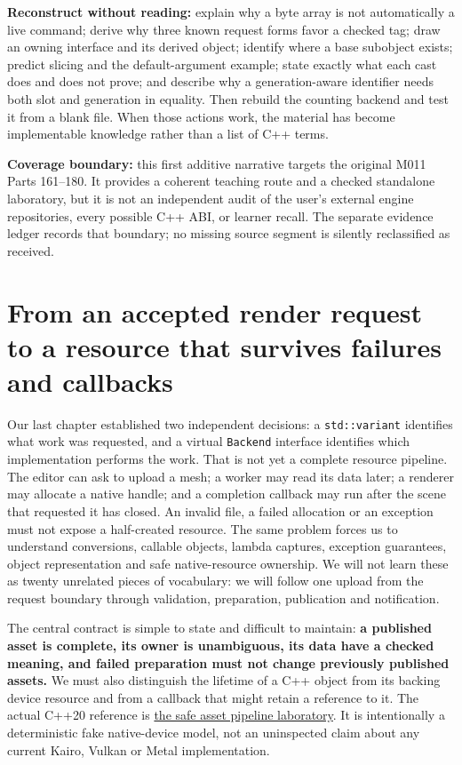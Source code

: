 \textbf{Reconstruct without reading:} explain why a byte array is not automatically a live command; derive why three known request forms favor a checked tag; draw an owning interface and its derived object; identify where a base subobject exists; predict slicing and the default-argument example; state exactly what each cast does and does not prove; and describe why a generation-aware identifier needs both slot and generation in equality. Then rebuild the counting backend and test it from a blank file. When those actions work, the material has become implementable knowledge rather than a list of C++ terms.

\textbf{Coverage boundary:} this first additive narrative targets the original M011 Parts 161--180. It provides a coherent teaching route and a checked standalone laboratory, but it is not an independent audit of the user's external engine repositories, every possible C++ ABI, or learner recall. The separate evidence ledger records that boundary; no missing source segment is silently reclassified as received.

\section{From an accepted render request to a resource that survives failures and callbacks}\label{01-foundations-i-ch004-from-an-accepted-render-request-to-a-resource-that-survives-failures-and-callbacks}

Our last chapter established two independent decisions: a \texttt{std::variant} identifies what work was requested, and a virtual \texttt{Backend} interface identifies which implementation performs the work. That is not yet a complete resource pipeline. The editor can ask to upload a mesh; a worker may read its data later; a renderer may allocate a native handle; and a completion callback may run after the scene that requested it has closed. An invalid file, a failed allocation or an exception must not expose a half-created resource. The same problem forces us to understand conversions, callable objects, lambda captures, exception guarantees, object representation and safe native-resource ownership. We will not learn these as twenty unrelated pieces of vocabulary: we will follow one upload from the request boundary through validation, preparation, publication and notification.

The central contract is simple to state and difficult to maintain: \textbf{a published asset is complete, its owner is unambiguous, its data have a checked meaning, and failed preparation must not change previously published assets.} We must also distinguish the lifetime of a C++ object from its backing device resource and from a callback that might retain a reference to it. The actual C++20 reference is \hyperref[source-file-32e93bc026677e074aaa7771]{the safe asset pipeline laboratory}. It is intentionally a deterministic fake native-device model, not an uninspected claim about any current Kairo, Vulkan or Metal implementation.

